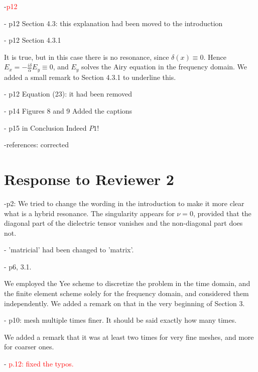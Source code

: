 \documentclass[a4paper,10pt]{article}
\begin{document}
-{\textcolor{red}{p12}}


- p12 Section 4.3: this explanation had been moved to the introduction



- p12 Section 4.3.1

  It is true, but in this case there is no resonance, since $\delta(x)\equiv 0$. Hence $E_x=-\frac{i\delta}{\alpha}E_y\equiv 0$, 
  and $E_y$ solves the Airy equation in the frequency domain. We added a small remark to Section 4.3.1 to underline this. 

  
- p12 Equation (23): it had been removed
  
- p14 Figures 8 and 9
Added the captions  


- p15 in Conclusion
  Indeed $P1$!
  
 -references: corrected
  

\section{Response to  Reviewer 2}
 
-p2:  We tried to change the wording in the introduction to make it more clear what is a hybrid resonance. 
The singularity appears for $\nu=0$, provided that the diagonal part of the dielectric tensor vanishes and the non-diagonal part does not. 

- 'matricial' had been changed to 'matrix'.

- p6, 3.1. 

We employed the Yee scheme to discretize the problem in the time domain, and the finite element scheme solely for the frequency domain, 
and considered them independently. We added a remark on that in the very beginning of Section 3. 

- p10: mesh multiple times finer. It should be said exactly how many times. 

We added a remark that it was at least two times for very fine meshes, and more for coarser ones.

- {\textcolor{red}{p.12: fixed the typos.}}


  
 
\end{document}

